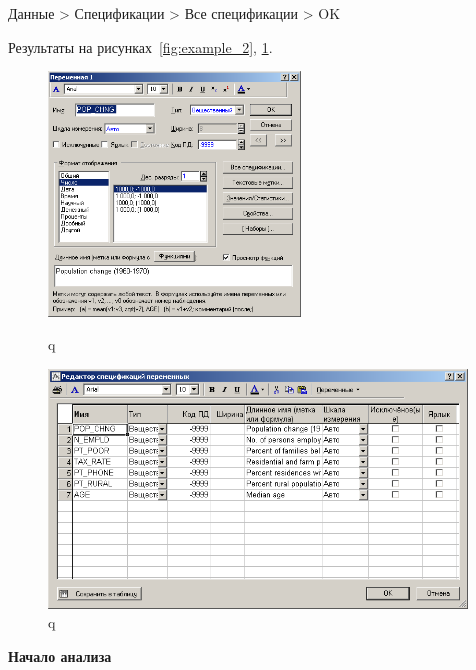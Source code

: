 \newpage

Данные > Спецификации > Все спецификации > OK 

Результаты на рисунках~\ref{fig:example_2}, \ref{fig:example_3}.

\begin{figure}[!h]
  \centering
  \begin{minipage}{0.49\textwidth}
    \centering

    \includegraphics[height=6.5cm]
    {inc/example_2.PNG}

    \caption{q}
    \label{fig:example_2}
  \end{minipage}
  \begin{minipage}{0.49\textwidth}
    \centering

    \includegraphics[width=0.99\textwidth]
    {inc/example_3.PNG}

    \caption{q}
    \label{fig:example_3}
  \end{minipage}
\end{figure}

\begin{center}
  \textbf{Начало анализа}
\end{center}

